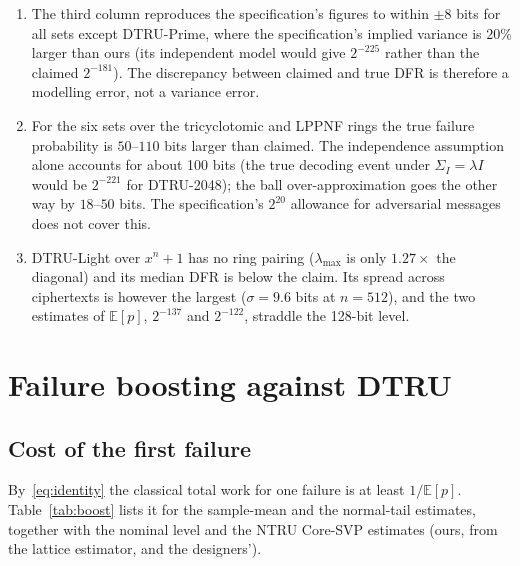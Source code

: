 \documentclass[11pt,a4paper]{article}
\theoremstyle{definition}
\theoremstyle{remark}
\newcommand{\E}{\mathbb{E}}
\begin{document}
\begin{enumerate}
\item The third column reproduces the specification's figures to within
$\pm8$ bits for all sets except DTRU-Prime, where the specification's
implied variance is $20\%$ larger than ours (its independent model would
give $2^{-225}$ rather than the claimed $2^{-181}$). The discrepancy
between claimed and true DFR is therefore a modelling error, not a
variance error.
\item For the six sets over the tricyclotomic and LPPNF rings the true
failure probability is $50$--$110$ bits larger than claimed. The
independence assumption alone accounts for about 100 bits (the true
decoding event under $\Sigma_I=\lambda I$ would be $2^{-221}$ for DTRU-2048);
the ball over-approximation goes the other way by $18$--$50$ bits. The
specification's $2^{20}$ allowance for adversarial messages does not cover
this.
\item DTRU-Light over $x^n+1$ has no ring pairing ($\lambda_{\max}$ is only
$1.27\times$ the diagonal) and its median DFR is below the claim. Its
spread across ciphertexts is however the largest ($\sigma=9.6$ bits at
$n=512$), and the two estimates of $\E[p]$, $2^{-137}$ and $2^{-122}$,
straddle the 128-bit level.
\end{enumerate}

\section{Failure boosting against DTRU}
\label{sec:boost}

\subsection{Cost of the first failure}
By~\eqref{eq:identity} the classical total work for one failure is at least
$1/\E[p]$. Table~\ref{tab:boost} lists it for the sample-mean and the
normal-tail estimates, together with the nominal level and the NTRU
Core-SVP estimates (ours, from the lattice estimator, and the designers').
\end{document}
